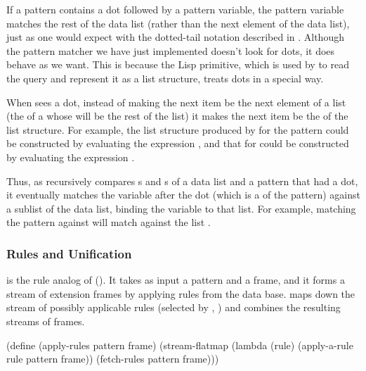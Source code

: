 If a pattern contains a dot followed by a pattern variable, the pattern
variable matches the rest of the data list (rather than the next element of the
data list), just as one would expect with the dotted-tail notation described in
.  Although the pattern matcher we have just implemented
doesn't look for dots, it does behave as we want.  This is because the Lisp
 primitive, which is used by  to read the
query and represent it as a list structure, treats dots in a special way.

When  sees a dot, instead of making the next item be the next
element of a list (the  of a  whose  will be the
rest of the list) it makes the next item be the  of the list
structure.  For example, the list structure produced by  for the
pattern  could be constructed by evaluating the
expression , and that for
 could be constructed by evaluating the expression
.

Thus, as  recursively compares s and s
of a data list and a pattern that had a dot, it eventually matches the variable
after the dot (which is a  of the pattern) against a sublist of the
data list, binding the variable to that list.  For example, matching the
pattern  against 
will match  against the list .

\subsubsection{Rules and Unification}
\label{Section 4.4.4.4}

 is the rule analog of 
().  It takes as input a pattern and a frame, and it forms a stream
of extension frames by applying rules from the data base.
 maps  down the stream of possibly
applicable rules (selected by , ) and
combines the resulting streams of frames.

\begin{codeBlock}
(define (apply-rules pattern frame)
  (stream-flatmap (lambda (rule)
                    (apply-a-rule rule pattern frame))
                  (fetch-rules pattern frame)))
\end{codeBlock}

